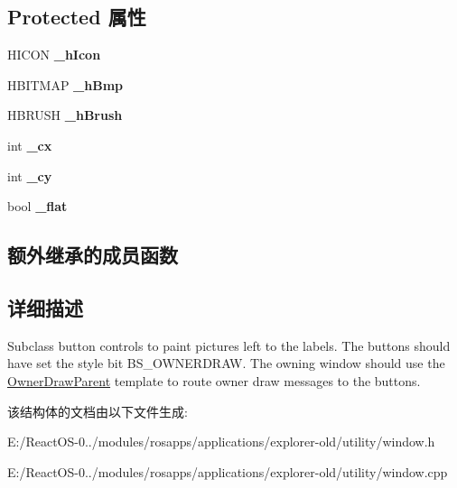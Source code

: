 \subsection*{Protected 属性}
\begin{DoxyCompactItemize}
\item 
\mbox{\label{struct_picture_button_a3be2e79e951238c00409b7e5868aa18c}} 
H\+I\+C\+ON {\bfseries \+\_\+h\+Icon}
\item 
\mbox{\label{struct_picture_button_a30a445c67dfe40847ee693e361aaaef7}} 
H\+B\+I\+T\+M\+AP {\bfseries \+\_\+h\+Bmp}
\item 
\mbox{\label{struct_picture_button_abad6eb5c295777db2de00303073f6e44}} 
H\+B\+R\+U\+SH {\bfseries \+\_\+h\+Brush}
\item 
\mbox{\label{struct_picture_button_a373ebf42e4d9caf22feb91262542f6e9}} 
int {\bfseries \+\_\+cx}
\item 
\mbox{\label{struct_picture_button_ab915ef3c4f704381a05f2bfea5839a7d}} 
int {\bfseries \+\_\+cy}
\item 
\mbox{\label{struct_picture_button_a3bb02432a86f79fb32569e4c9796cf4b}} 
bool {\bfseries \+\_\+flat}
\end{DoxyCompactItemize}
\subsection*{额外继承的成员函数}


\subsection{详细描述}
Subclass button controls to paint pictures left to the labels. The buttons should have set the style bit B\+S\+\_\+\+O\+W\+N\+E\+R\+D\+R\+AW. The owning window should use the \hyperlink{struct_owner_draw_parent}{Owner\+Draw\+Parent} template to route owner draw messages to the buttons. 

该结构体的文档由以下文件生成\+:\begin{DoxyCompactItemize}
\item 
E\+:/\+React\+O\+S-\/0../modules/rosapps/applications/explorer-\/old/utility/window.\+h\item 
E\+:/\+React\+O\+S-\/0../modules/rosapps/applications/explorer-\/old/utility/window.\+cpp\end{DoxyCompactItemize}
